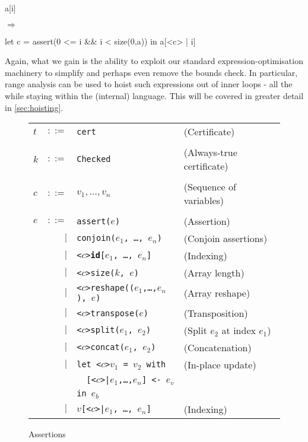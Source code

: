 \begin{minipage}{0.1\columnwidth}
\begin{center}
\begin{colorcode}
a[i]
\end{colorcode}
\end{center}
\end{minipage}
$\Rightarrow$
\begin{minipage}{0.46\columnwidth}
\begin{center}
\begin{colorcode}
let c = assert(0 <= i && i < size(0,a)) in
a[<c> | i]
\end{colorcode}
\end{center}
\end{minipage}

Again, what we gain is the ability to exploit our standard
expression-optimisation machinery to simplify and perhaps even remove
the bounds check.  In particular, range analysis can be used to hoist
such expressions out of inner loops - all the while staying within the
(internal) \LO{} language.  This will be covered in greater detail in
\cref{sec:hoisting}.

\begin{figure}[bt]
\begin{tabular}{lrll}
$t$ & $::=$ & \texttt{cert} & (Certificate) \\
\\
$k$ & $::=$ & \texttt{Checked} & (Always-true certificate) \\
\\
$c$ & $::=$ & $v_1, \ldots ,v_{n}$ & (Sequence of variables) \\
\\
$e$ & $::=$ & \texttt{assert($e$)} & (Assertion) \\
& $|$ & \texttt{conjoin($e_{1}$, \ldots, $e_{n}$)} & (Conjoin assertions) \\
& $|$ & \texttt{<$c$>\textbf{id}[$e_{1}$, \ldots, $e_{n}$]} & (Indexing) \\
& $|$ & \texttt{<$c$>size($k$, $e$)} & (Array length) \\
& $|$ & \texttt{<$c$>reshape(($e_{1}$,\ldots,$e_{n}$), $e$)} & (Array reshape) \\
& $|$ & \texttt{<$c$>transpose($e$)} & (Transposition) \\
& $|$ & \texttt{<$c$>split($e_{1}$, $e_{2}$)} & (Split $e_{2}$ at index $e_{1}$) \\
& $|$ & \texttt{<$c$>concat($e_{1}$, $e_{2}$)} & (Concatenation) \\
& $|$ & \texttt{let <$c$>$v_{1}$ = $v_{2}$ with} & (In-place update) \\
&     & \texttt{\ \ [<$c$>|$e_{1}$,\ldots,$e_{n}$] <- $e_{v}$} \\
&     & \texttt{in $e_{b}$} \\
& $|$ & \texttt{$v$[<$c$>|$e_{1}$, \ldots, $e_{n}$]} & (Indexing) \\
\end{tabular}
\caption{Assertions}
\label{fig:assertions}
\end{figure}

